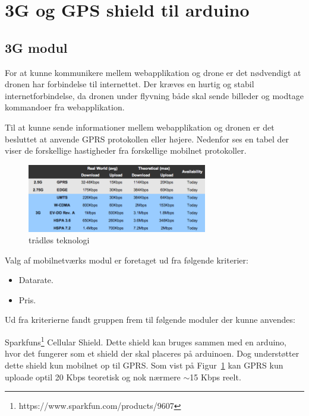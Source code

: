 \section{3G og GPS shield til arduino}

\subsection{3G modul}
For at kunne kommunikere mellem webapplikation og drone er det nødvendigt at dronen har forbindelse til internettet. 
Der kræves en hurtig og stabil internetforbindelse, da dronen under flyvning både skal sende billeder og modtage kommandoer fra webapplikation.

Til at kunne sende informationer mellem webapplikation og dronen er det besluttet at anvende GPRS protokollen eller højere. Nedenfor ses en tabel der viser de forskellige hastigheder fra forskellige mobilnet protokoller. 

\begin{figure}[H]
\centering
\includegraphics[width=0.7\textwidth]{Billeder/3g-table.png}
\caption[trådløs_teknologi]{trådløs teknologi\protect\footnotemark}
\label{fig:3gtable}
\end{figure}


Valg af mobilnetværks modul er foretaget ud fra følgende kriterier:
\begin{itemize}
	\item Datarate.
	\item Pris.
\end{itemize}

Ud fra kriterierne fandt gruppen frem til følgende moduler der kunne anvendes:

Sparkfuns\footnote{https://www.sparkfun.com/products/9607} Cellular Shield. \newline 
Dette shield kan bruges sammen med en arduino, hvor det fungerer som et shield der skal placeres på arduinoen.
Dog understøtter dette shield kun mobilnet op til GPRS. Som vist på Figur~\ref{fig:3gtable} kan GPRS kun uploade optil 20 Kbps teoretisk og nok nærmere $\sim$15 Kbps reelt.

